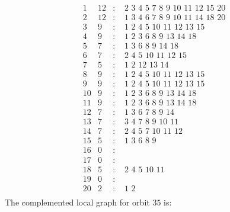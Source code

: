 \documentclass[12pt]{article}
\begin{document}
\begin{equation*}
\begin{array}{rrcl}
1&12&:&\,\,2\,\,3\,\,4\,\,5\,\,7\,\,8\,\,9\,\,10\,\,11\,\,12\,\,15\,\,20\\
2&12&:&\,\,1\,\,3\,\,4\,\,6\,\,7\,\,8\,\,9\,\,10\,\,11\,\,14\,\,18\,\,20\\
3&9&:&\,\,1\,\,2\,\,4\,\,5\,\,10\,\,11\,\,12\,\,13\,\,15\\
4&9&:&\,\,1\,\,2\,\,3\,\,6\,\,8\,\,9\,\,13\,\,14\,\,18\\
5&7&:&\,\,1\,\,3\,\,6\,\,8\,\,9\,\,14\,\,18\\
6&7&:&\,\,2\,\,4\,\,5\,\,10\,\,11\,\,12\,\,15\\
7&5&:&\,\,1\,\,2\,\,12\,\,13\,\,14\\
8&9&:&\,\,1\,\,2\,\,4\,\,5\,\,10\,\,11\,\,12\,\,13\,\,15\\
9&9&:&\,\,1\,\,2\,\,4\,\,5\,\,10\,\,11\,\,12\,\,13\,\,15\\
10&9&:&\,\,1\,\,2\,\,3\,\,6\,\,8\,\,9\,\,13\,\,14\,\,18\\
11&9&:&\,\,1\,\,2\,\,3\,\,6\,\,8\,\,9\,\,13\,\,14\,\,18\\
12&7&:&\,\,1\,\,3\,\,6\,\,7\,\,8\,\,9\,\,14\\
13&7&:&\,\,3\,\,4\,\,7\,\,8\,\,9\,\,10\,\,11\\
14&7&:&\,\,2\,\,4\,\,5\,\,7\,\,10\,\,11\,\,12\\
15&5&:&\,\,1\,\,3\,\,6\,\,8\,\,9\\
16&0&:&\\
17&0&:&\\
18&5&:&\,\,2\,\,4\,\,5\,\,10\,\,11\\
19&0&:&\\
20&2&:&\,\,1\,\,2\\
\end{array}
\end{equation*}
The complemented local graph for orbit $35$ is:
\end{document}
